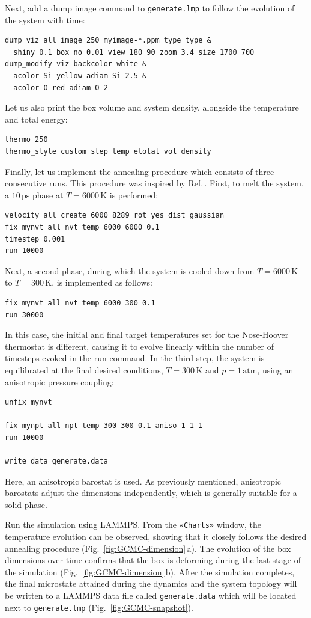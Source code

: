 \documentclass[9pt,tutorial]{livecoms}
\newcommand{\lmpcmd}[1]{\colorbox{listing}{\textcolor{command}{\small{#1}}}} %
\newcommand{\flecmd}[1]{\textcolor{command}{\texttt{#1}}} %
\newcommand{\guicmd}[1]{\textcolor{command}{\texttt{«#1»}}} %
\begin{document}
Next, add a \lmpcmd{dump image} command to \flecmd{generate.lmp} to follow the
evolution of the system with time:
\begin{lstlisting}
dump viz all image 250 myimage-*.ppm type type &
  shiny 0.1 box no 0.01 view 180 90 zoom 3.4 size 1700 700
dump_modify viz backcolor white &
  acolor Si yellow adiam Si 2.5 &
  acolor O red adiam O 2
\end{lstlisting}
Let us also print the box volume and system density, alongside the
temperature and total energy:
\begin{lstlisting}
thermo 250
thermo_style custom step temp etotal vol density
\end{lstlisting}

Finally, let us implement the annealing procedure which
consists of three consecutive runs.  This procedure was inspired
by Ref.\,\cite{della1992molecular}.  First, to melt the system,
a $10\,\text{ps}$ phase at $T = 6000\,\text{K}$ is performed:
\begin{lstlisting}
velocity all create 6000 8289 rot yes dist gaussian
fix mynvt all nvt temp 6000 6000 0.1
timestep 0.001
run 10000
\end{lstlisting}
Next, a second phase, during which the system is cooled down from $T = 6000\,\text{K}$
to $T = 300\,\text{K}$, is implemented as follows:
\begin{lstlisting}
fix mynvt all nvt temp 6000 300 0.1
run 30000
\end{lstlisting}
{\color{blue} In this case, the initial and final target temperatures 
set for the Nose-Hoover thermostat is different, causing it to evolve
linearly within the number of timesteps evoked in the \lmpcmd{run} 
command.  }
In the third step, the system is equilibrated at the final desired
conditions, $T = 300\,\text{K}$ and $p = 1\,\text{atm}$,
using an anisotropic pressure coupling:
\begin{lstlisting}
unfix mynvt

fix mynpt all npt temp 300 300 0.1 aniso 1 1 1
run 10000

write_data generate.data
\end{lstlisting}
Here, an anisotropic barostat is used.
{\color{blue}As previously mentioned, a}nisotropic 
barostats adjust the dimensions independently, which is
generally suitable for a solid phase.

Run the simulation using LAMMPS.  From the \guicmd{Charts} window, the temperature
evolution can be observed, showing that it closely follows the desired annealing procedure (Fig.~\ref{fig:GCMC-dimension}\,a).
The evolution of the box dimensions over time confirms that the box
{\color{blue}is deforming} during the last stage of the simulation
(Fig.~\ref{fig:GCMC-dimension}\,b).  After the simulation completes, the final
{\color{blue} microstate attained during the dynamics and the system topology
will be written to a} LAMMPS {\color{blue} data }file called \flecmd{generate.data} 
{\color{blue}which} will be located next to \flecmd{generate.lmp} (Fig.~\ref{fig:GCMC-snapshot}).
\end{document}
